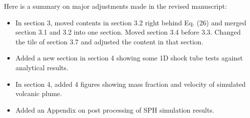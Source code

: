 \documentclass[10pt,a4paper]{article}
\begin{document}
Here is a summary on major adjustments made in the revised manuscript: 
\begin{itemize}
\item In section 3, moved contents in section 3.2 right behind Eq. (26) and merged section 3.1 and 3.2  into one section. Moved section 3.4 before 3.3. Changed the tile of section 3.7 and adjusted the content in that section.
\item Added a new section in section 4 showing some 1D shock tube tests against analytical results.
\item In section 4, added 4 figures showing mass fraction and velocity of simulated volcanic plume.
\item Added an Appendix on post processing of SPH simulation results.
\end{itemize}



\end{document}
